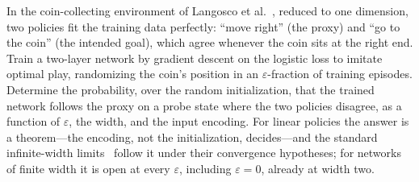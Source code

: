 \begin{openproblem}
In the coin-collecting environment of Langosco et al.~\cite{langosco2022}, reduced to one dimension, two policies fit the training data perfectly: ``move right'' (the proxy) and ``go to the coin'' (the intended goal), which agree whenever the coin sits at the right end. Train a two-layer network by gradient descent on the logistic loss to imitate optimal play, randomizing the coin's position in an $\varepsilon$-fraction of training episodes. Determine the probability, over the random initialization, that the trained network follows the proxy on a probe state where the two policies disagree, as a function of $\varepsilon$, the width, and the input encoding. For linear policies the answer is a theorem---the encoding, not the initialization, decides---and the standard infinite-width limits~\cite{jacot2018,mei2018,chizat2020} follow it under their convergence hypotheses; for networks of finite width it is open at every $\varepsilon$, including $\varepsilon=0$, already at width two.
\end{openproblem}

